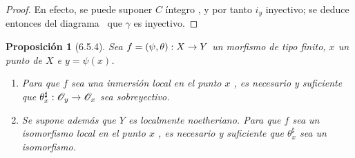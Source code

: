 \documentclass[oneside]{amsart}
\theoremstyle{ega-env-style}
\theoremstyle{ega-thm-env-style}
\newtheorem*{proposition}{Proposición}
\theoremstyle{ega-defn-env-style}
\renewcommand{\to}{\mathchoice{\longrightarrow}{\rightarrow}{\rightarrow}{\rightarrow}}
\let\EGAOriginalLabel\label
\renewcommand{\label}[1]{\phantomsection\EGAOriginalLabel{#1}}
\begin{document}
\begin{proof}
En efecto, se puede suponer $C$ íntegro , y por tanto $i_y$ inyectivo; se deduce entonces del diagrama~ que $\gamma$ es inyectivo.
\end{proof}

\begin{proposition}[6.5.4]
\label{I.6.5.4}
Sea $f=(\psi,\theta):X\to Y$ un morfismo de tipo finito, $x$ un punto de $X$ e $y=\psi(x)$.
\begin{enumerate}
  \item[{\rm(i)}] Para que $f$ sea una inmersión local en el punto $x$ , es necesario y suficiente que $\theta_x^\sharp:\mathscr{O}_y\to\mathscr{O}_x$ sea sobreyectivo.
  \item[{\rm(ii)}] Se supone además que $Y$ es localmente noetheriano.
    Para que $f$ sea un isomorfismo local en el punto $x$ , es necesario y suficiente que $\theta_x^\sharp$ sea un isomorfismo.
\end{enumerate}
\end{proposition}
\end{document}
